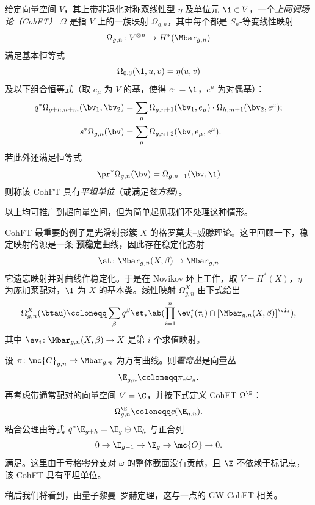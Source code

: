 \begin{defn}
    给定向量空间 $V$，其上带非退化对称双线性型 $\eta$ 及单位元 $\1 \in V$，一个\textit{上同调场论（CohFT）} $\Omega$ 是指 $V$ 上的一族映射 $\Omega_{g,n}$，其中每个都是 $S_n$-等变线性映射
    \[ \Omega_{g,n} \colon V^{\otimes n} \to H^*(\Mbar_{g,n}) \]
    满足基本恒等式
    \[ \Omega_{0,3}(\1, u,v) = \eta(u,v) \]
    及以下组合恒等式（取 $e_{\mu}$ 为 $V$ 的基，使得 $e_1 = \1$，$e^{\mu}$ 为对偶基）：
    \begin{align*}
        q^* \Omega_{g+h,n+m}(\bv_1, \bv_2) &= \sum_{\mu} \Omega_{g,n+1}(\bv_1, e_{\mu}) \cdot \Omega_{h,m+1}(  \bv_2, e^{\mu} ); \\
        s^* \Omega_{g,n}(\bv) &= \sum_{\mu} \Omega_{g,n+2}(\bv, e_{\mu}, e^{\mu}).
    \end{align*}
    若此外还满足恒等式
    \[ \pr^*\Omega_{g,n}(\bv) = \Omega_{g,n+1}(\bv,\1) \]
    则称该 CohFT 具有\textit{平坦单位}（或满足\textit{弦方程}）。
\end{defn}
以上均可推广到超向量空间，但为简单起见我们不处理这种情形。

\begin{exm}
    CohFT 最重要的例子是光滑射影簇 $X$ 的格罗莫夫–威滕理论。这里回顾一下，稳定映射的源是一条 \textbf{预稳定}曲线，因此存在稳定化态射
    \[ \st \colon \Mbar_{g,n}(X,\beta) \to \Mbar_{g,n} \]
    它遗忘映射并对曲线作稳定化。于是在 Novikov 环上工作，取 $V = H^*(X)$，$\eta$ 为庞加莱配对，$\1$ 为 $X$ 的基本类。线性映射 $\Omega^X_{g,n}$ 由下式给出
    \[ \Omega_{g,n}^X(\btau) \coloneqq \sum_{\beta} q^{\beta} \st_* \ab(\prod_{i=1}^n \ev_i^*(\tau_i) \cap [\Mbar_{g,n}(X,\beta)]^{\vir}), \]
    其中 $\ev_i \colon \Mbar_{g,n}(X,\beta) \to X$ 是第 $i$ 个求值映射。
\end{exm}

\begin{exm}
    设 $\pi \colon \mc{C}_{g,n} \to \Mbar_{g,n}$ 为万有曲线。则\textit{霍奇丛}是向量丛
    \[ \E_{g,n} \coloneqq \pi_* \omega_{\pi}. \]
    再考虑带通常配对的向量空间 $V = \C$，并按下式定义 CohFT $\Omega^{\E}$：
    \[ \Omega^{\E}_{g,n} \coloneqq c(\E_{g,n}). \]
    粘合公理由等式 $q^* \E_{g+h} = \E_g \oplus \E_h$ 与正合列
    \[ 0 \to \E_{g-1} \to \E_g \to \mc{O} \to 0. \]
    满足。这里由于亏格零分支对 $\omega$ 的整体截面没有贡献，且 $\E$ 不依赖于标记点，该 CohFT 具有平坦单位。
\end{exm}

\begin{rmk}
    稍后我们将看到，由量子黎曼–罗赫定理，这与一点的 GW CohFT 相关。
\end{rmk}

